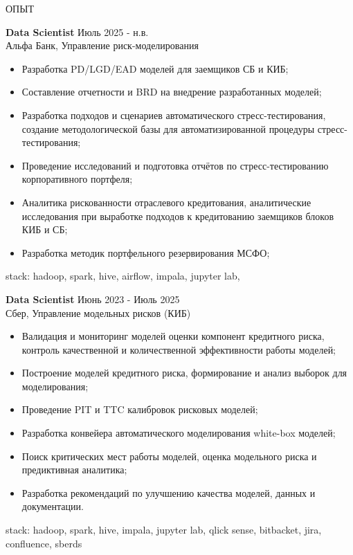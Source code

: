 \documentclass{resume} %
\begin{document}
\begin{rSection}{ОПЫТ}

\textbf{Data Scientist} \hfill Июль 2025 - н.в. \\ 
Альфа Банк, Управление риск-моделирования
 \begin{itemize}
    \itemsep -3pt {}
\item Разработка PD/LGD/EAD моделей для заемщиков СБ и КИБ;
\item Составление отчетности и BRD на внедрение разработанных моделей;
\item Разработка подходов и сценариев автоматического стресс-тестирования, создание методологической базы для автоматизированной процедуры стресс-тестирования;
\item Проведение исследований и подготовка отчётов по стресс-тестированию корпоративного портфеля;
\item Аналитика рискованности отраслевого кредитования, аналитические исследования при выработке подходов к кредитованию заемщиков блоков КИБ и СБ;
\item Разработка методик портфельного резервирования МСФО;
 \end{itemize}

stack: hadoop, spark, hive, airflow, impala, jupyter lab, 

\textbf{Data Scientist} \hfill Июнь 2023 - Июль 2025 \\ 
Сбер, Управление модельных рисков (КИБ)
 \begin{itemize}
    \itemsep -3pt {}
\item Валидация и мониторинг моделей оценки компонент кредитного риска, контроль качественной и количественной эффективности работы моделей;
\item Построение моделей кредитного риска, формирование и анализ выборок для моделирования;
\item Проведение PIT и TTC калибровок рисковых моделей;
\item Разработка конвейера автоматического моделирования white-box моделей;
\item Поиск критических мест работы моделей, оценка модельного риска и предиктивная аналитика;
\item Разработка рекомендаций по улучшению качества моделей, данных и документации.
 \end{itemize}

stack: hadoop, spark, hive, impala, jupyter lab, qlick sense, bitbacket, jira, confluence, sberds

\end{rSection}
\end{document}
